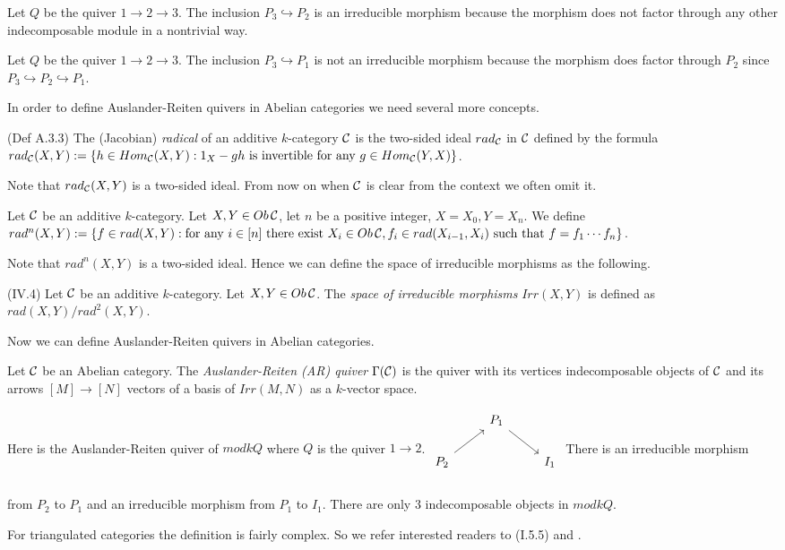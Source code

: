 \begin{example}
Let $Q$ be the quiver $1\to 2\to 3$. The inclusion $P_3\hookrightarrow P_2$ is an irreducible morphism because the morphism does not factor through any other indecomposable module in a nontrivial way.
\end{example}
\begin{example}
Let $Q$ be the quiver $1\to 2\to 3$. The inclusion $P_3\hookrightarrow P_1$ is not an irreducible morphism because the morphism does factor through $P_2$ since $P_3\hookrightarrow P_2\hookrightarrow P_1$.
\end{example}
\indent In order to define Auslander-Reiten quivers in Abelian categories we need several more concepts.\\
\begin{definition}
\cite{ASS06}(Def A.3.3) The (Jacobian) \textit{radical} of an additive $k$-category $\mathcal{C}$ is the two-sided ideal $rad_{\mathcal{C}}$ in $\mathcal{C}$ defined by the formula $rad_{\mathcal{C}}(X,Y) := \{h\in Hom_{\mathcal{C}}(X, Y): 1_X-gh\text{ is invertible for any }g\in Hom_{\mathcal{C}}(Y,X)\}$.
\end{definition}
\indent Note that $rad_{\mathcal{C}}(X, Y)$ is a two-sided ideal. From now on when $\mathcal{C}$ is clear from the context we often omit it.\\
\begin{definition}
Let $\mathcal{C}$ be an additive $k$-category. Let $X, Y\in Ob\,\mathcal{C}$, let $n$ be a positive integer, $X=X_0, Y=X_n$. We define $rad^n(X,Y):=\{f\in rad(X,Y):\text{for any }i\in [n]\text{ there exist }X_i\in Ob\,\mathcal{C}, f_i\in rad(X_{i-1}, X_{i})\text{ such that }f=f_1\cdots f_n\}$. 
\end{definition}
\indent Note that $rad^n(X, Y)$ is a two-sided ideal. Hence we can define the space of irreducible morphisms as the following.\\
\begin{definition}
\cite{ASS06}(IV.4) Let $\mathcal{C}$ be an additive $k$-category. Let $X, Y\in Ob\,\mathcal{C}$. The \textit{space of irreducible morphisms} $Irr(X,Y)$ is defined as $rad(X,Y)/rad^2(X,Y)$.
\end{definition}
\indent Now we can define Auslander-Reiten quivers in Abelian categories.\\
\begin{definition}
Let $\mathcal{C}$ be an Abelian category. The \textit{Auslander-Reiten (AR) quiver} $\Gamma(\mathcal{C})$ is the quiver with its vertices indecomposable objects of $\mathcal{C}$ and its arrows $[M]\to[N]$ vectors of a basis of $Irr(M,N)$ as a $k$-vector space.
\end{definition}
\begin{example} Here is the Auslander-Reiten quiver of $mod kQ$ where $Q$ is the quiver $1\to 2$.
$\begin{tikzcd}
&P_1\arrow[rd] &\\
P_2\arrow[ru]& &I_1\\
\end{tikzcd}$ There is an irreducible morphism from $P_2$ to $P_1$ and an irreducible morphism from $P_1$ to $I_1$. There are only 3 indecomposable objects in $mod kQ$.
\end{example}
\indent For triangulated categories the definition is fairly complex. So we refer interested readers to \cite{H88} (I.5.5) and \cite{S09}.
